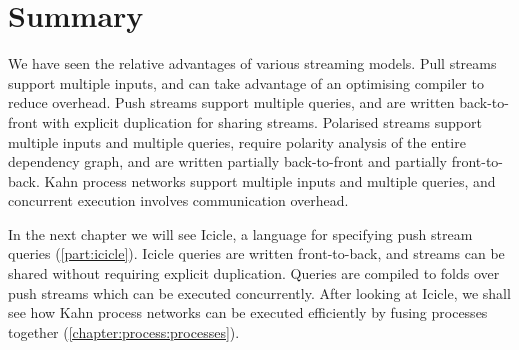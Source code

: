 

\section{Summary}
We have seen the relative advantages of various streaming models.
Pull streams support multiple inputs, and can take advantage of an optimising compiler to reduce overhead.
Push streams support multiple queries, and are written back-to-front with explicit duplication for sharing streams.
Polarised streams support multiple inputs and multiple queries, require polarity analysis of the entire dependency graph, and are written partially back-to-front and partially front-to-back.
Kahn process networks support multiple inputs and multiple queries, and concurrent execution involves communication overhead.

In the next chapter we will see Icicle, a language for specifying push stream queries (\cref{part:icicle}).
Icicle queries are written front-to-back, and streams can be shared without requiring explicit duplication.
Queries are compiled to folds over push streams which can be executed concurrently.
After looking at Icicle, we shall see how Kahn process networks can be executed efficiently by fusing processes together (\cref{chapter:process:processes}).


